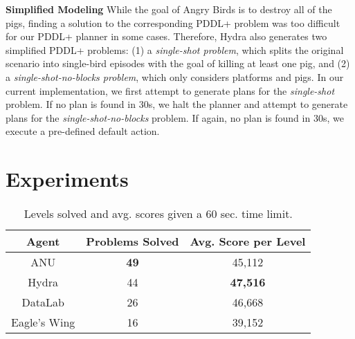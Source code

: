 \documentclass[letterpaper]{article}
\begin{document}
\noindent\textbf{Simplified Modeling} While the goal of Angry Birds is to destroy all of the pigs, finding a solution to the corresponding PDDL+ problem was too difficult for our PDDL+ planner in some cases.
Therefore, Hydra also generates two simplified PDDL+ problems:
(1) a \textit{single-shot problem}, which splits the original scenario into single-bird episodes with the goal of killing at least one pig, and (2) a \textit{single-shot-no-blocks problem}, which only considers platforms and pigs. In our current implementation, we first attempt to generate plans for the \textit{single-shot} problem.
If no plan is found in 30s, we halt the planner and attempt to generate plans for the \textit{single-shot-no-blocks} problem.
If again, no plan is found in 30s, we execute a pre-defined default action.
































\section{Experiments}

\begin{table}[tb!]
\centering
\small
\begin{adjustbox}{width=0.75\columnwidth}
\begin{tabular}{|c|c|c|}
\hline
\textbf{Agent} & \textbf{Problems Solved} & \textbf{Avg. Score per Level} \\ \hline
ANU    & \textbf{49}              & 45,112                      \\ \hline
Hydra          & 44                       & \textbf{47,516}             \\ \hline
DataLab        & 26                       & 46,668                      \\ \hline
Eagle's  Wing  & 16                       & 39,152                      \\ \hline
\end{tabular}
\end{adjustbox}
\caption{Levels solved and avg. scores given a 60 sec. time limit.}
\label{tab:results}
\end{table}
\end{document}
